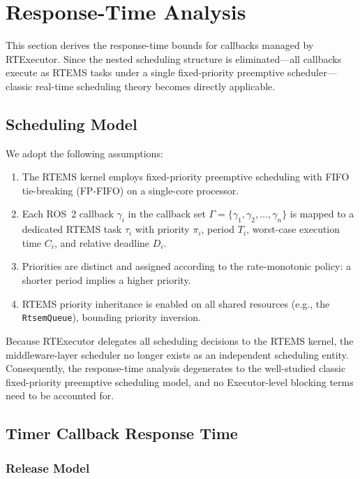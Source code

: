 \section{Response-Time Analysis}

This section derives the response-time bounds for callbacks managed by RTExecutor.
Since the nested scheduling structure is eliminated---all callbacks execute as RTEMS tasks under a single fixed-priority preemptive scheduler---classic real-time scheduling theory becomes directly applicable.

\subsection{Scheduling Model}

We adopt the following assumptions:
\begin{enumerate}
    \item The RTEMS kernel employs fixed-priority preemptive scheduling with FIFO tie-breaking (FP-FIFO) on a single-core processor.
    \item Each ROS~2 callback $\gamma_i$ in the callback set $\Gamma = \{\gamma_1, \gamma_2, \dots, \gamma_n\}$ is mapped to a dedicated RTEMS task $\tau_i$ with priority $\pi_i$, period $T_i$, worst-case execution time $C_i$, and relative deadline $D_i$.
    \item Priorities are distinct and assigned according to the rate-monotonic policy: a shorter period implies a higher priority.
    \item RTEMS priority inheritance is enabled on all shared resources (e.g., the \texttt{RtsemQueue}), bounding priority inversion.
\end{enumerate}

Because RTExecutor delegates all scheduling decisions to the RTEMS kernel, the middleware-layer scheduler no longer exists as an independent scheduling entity.
Consequently, the response-time analysis degenerates to the well-studied classic fixed-priority preemptive scheduling model, and no Executor-level blocking terms need to be accounted for.

\subsection{Timer Callback Response Time}

\subsubsection{Release Model}

